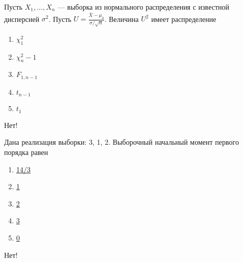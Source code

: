 \documentclass[t]{beamer}
\begin{document}
 \begin{frame} \label{19-No} 
\begin{block}{19} 

  Пусть $X_1,\ldots,X_n$ — выборка из нормального распределения с известной дисперсией $\sigma^2$. Пусть $U = \frac{\bar{X}-\mu_0}{\sigma/\sqrt{n}}$. Величина $U^2$ имеет распределение
  


 \end{block} 
\begin{enumerate} 
\item[] \hyperlink{19-Yes}{\beamergotobutton{} $\chi^2_1$}
\item[] \hyperlink{19-No}{\beamergotobutton{} $\chi^2_n-1$}
\item[] \hyperlink{19-No}{\beamergotobutton{} $F_{1,n-1}$}
\item[] \hyperlink{19-No}{\beamergotobutton{} $t_{n-1}$}
\item[] \hyperlink{19-No}{\beamergotobutton{} $t_1$}
\end{enumerate} 

 \alert{Нет!} 
\end{frame} 


 \begin{frame} \label{20-No} 
\begin{block}{20} 

  Дана реализация выборки: 3, 1, 2. Выборочный начальный момент первого порядка равен
  


 \end{block} 
\begin{enumerate} 
\item[] \hyperlink{20-No}{\beamergotobutton{} 14/3}
\item[] \hyperlink{20-No}{\beamergotobutton{} 1}
\item[] \hyperlink{20-Yes}{\beamergotobutton{} 2}
\item[] \hyperlink{20-No}{\beamergotobutton{} 3}
\item[] \hyperlink{20-No}{\beamergotobutton{} 0}
\end{enumerate} 

 \alert{Нет!} 
\end{frame} 
\end{document}
